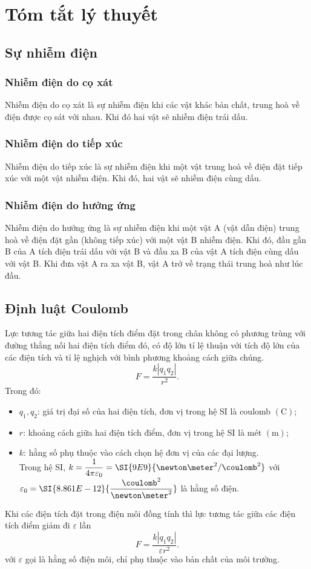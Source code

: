 \chapter{Tóm tắt lý thuyết}
\section{Sự nhiễm điện}
\subsection{Nhiễm điện do cọ xát}
Nhiễm điện do cọ xát là sự nhiễm điện khi các vật khác bản chất, trung hoà về điện được cọ sát với nhau. Khi đó hai vật sẽ nhiễm điện trái dấu.
\subsection{Nhiễm điện do tiếp xúc}
Nhiễm điện do tiếp xúc là sự nhiễm điện khi một vật trung hoà về điện đặt tiếp xúc với một vật nhiễm điện. Khi đó, hai vật sẽ nhiễm điện cùng dấu.
\subsection{Nhiễm điện do hưởng ứng}
Nhiễm điện do hưởng ứng là sự nhiễm điện khi một vật A (vật dẫn điện) trung hoà về điện đặt gần (không tiếp xúc) với một vật B nhiễm điện. Khi đó, đầu gần B của A tích điện trái dấu với vật B và đầu xa B của vật A tích điện cùng dấu với vật B. Khi đưa vật A ra xa vật B, vật A trở về trạng thái trung hoà như lúc đầu.
\section{Định luật Coulomb}
Lực tương tác giữa hai điện tích điểm đặt trong chân không có phương trùng với đường thẳng nối hai điện tích điểm đó, có độ lớn tỉ lệ thuận với tích độ lớn của các điện tích và tỉ lệ nghịch với bình phương khoảng cách giữa chúng.
$$F=\dfrac{k\left|q_1q_2\right|}{r^2}.$$
Trong đó:
\begin{itemize}
	\item $q_1, q_2$: giá trị đại số của hai điện tích, đơn vị trong hệ SI là coulomb $\left(\si{\coulomb}\right)$;
	\item $r$: khoảng cách giữa hai điện tích điểm, đơn vị trong hệ SI là mét $\left(\si{\meter}\right)$;
	\item $k$: hằng số phụ thuộc vào cách chọn hệ đơn vị của các đại lượng.\\
	Trong hệ SI, $k=\dfrac{1}{4\pi\varepsilon_0}=\SI{9E9}{\newton\meter^2/\coulomb^2}$ với $\varepsilon_0=\SI{8.861E-12}{\dfrac{\coulomb^2}{\newton\meter^2}}$ là hằng số điện.
\end{itemize}
Khi các điện tích đặt trong điện môi đồng tính thì lực tương tác giữa các điện tích điểm giảm đi $\varepsilon$ lần
$$F=\dfrac{k\left|q_1q_2\right|}{\varepsilon r^2}.$$
với $\varepsilon$ gọi là hằng số điện môi, chỉ phụ thuộc vào bản chất của môi trường.

